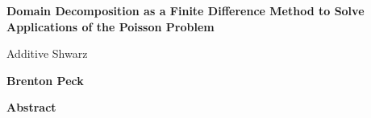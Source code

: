 \thispagestyle{plain}
\begin{center}
    \Large
    \textbf{Domain Decomposition as a Finite Difference Method to Solve Applications of the Poisson Problem}
    
    \vspace{0.4cm}
    \large
    Additive Shwarz
    
    \vspace{0.4cm}
    \textbf{Brenton Peck}
    
    \vspace{0.9cm}
    \textbf{Abstract}
\end{center}